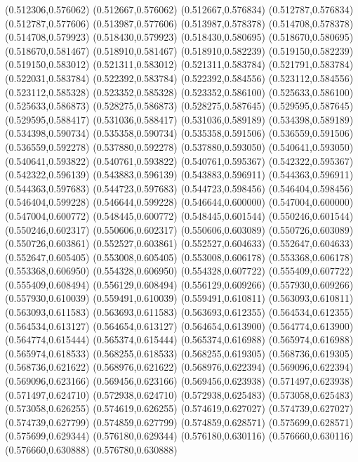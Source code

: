 (0.512306,0.576062)
(0.512667,0.576062)
(0.512667,0.576834)
(0.512787,0.576834)
(0.512787,0.577606)
(0.513987,0.577606)
(0.513987,0.578378)
(0.514708,0.578378)
(0.514708,0.579923)
(0.518430,0.579923)
(0.518430,0.580695)
(0.518670,0.580695)
(0.518670,0.581467)
(0.518910,0.581467)
(0.518910,0.582239)
(0.519150,0.582239)
(0.519150,0.583012)
(0.521311,0.583012)
(0.521311,0.583784)
(0.521791,0.583784)
(0.522031,0.583784)
(0.522392,0.583784)
(0.522392,0.584556)
(0.523112,0.584556)
(0.523112,0.585328)
(0.523352,0.585328)
(0.523352,0.586100)
(0.525633,0.586100)
(0.525633,0.586873)
(0.528275,0.586873)
(0.528275,0.587645)
(0.529595,0.587645)
(0.529595,0.588417)
(0.531036,0.588417)
(0.531036,0.589189)
(0.534398,0.589189)
(0.534398,0.590734)
(0.535358,0.590734)
(0.535358,0.591506)
(0.536559,0.591506)
(0.536559,0.592278)
(0.537880,0.592278)
(0.537880,0.593050)
(0.540641,0.593050)
(0.540641,0.593822)
(0.540761,0.593822)
(0.540761,0.595367)
(0.542322,0.595367)
(0.542322,0.596139)
(0.543883,0.596139)
(0.543883,0.596911)
(0.544363,0.596911)
(0.544363,0.597683)
(0.544723,0.597683)
(0.544723,0.598456)
(0.546404,0.598456)
(0.546404,0.599228)
(0.546644,0.599228)
(0.546644,0.600000)
(0.547004,0.600000)
(0.547004,0.600772)
(0.548445,0.600772)
(0.548445,0.601544)
(0.550246,0.601544)
(0.550246,0.602317)
(0.550606,0.602317)
(0.550606,0.603089)
(0.550726,0.603089)
(0.550726,0.603861)
(0.552527,0.603861)
(0.552527,0.604633)
(0.552647,0.604633)
(0.552647,0.605405)
(0.553008,0.605405)
(0.553008,0.606178)
(0.553368,0.606178)
(0.553368,0.606950)
(0.554328,0.606950)
(0.554328,0.607722)
(0.555409,0.607722)
(0.555409,0.608494)
(0.556129,0.608494)
(0.556129,0.609266)
(0.557930,0.609266)
(0.557930,0.610039)
(0.559491,0.610039)
(0.559491,0.610811)
(0.563093,0.610811)
(0.563093,0.611583)
(0.563693,0.611583)
(0.563693,0.612355)
(0.564534,0.612355)
(0.564534,0.613127)
(0.564654,0.613127)
(0.564654,0.613900)
(0.564774,0.613900)
(0.564774,0.615444)
(0.565374,0.615444)
(0.565374,0.616988)
(0.565974,0.616988)
(0.565974,0.618533)
(0.568255,0.618533)
(0.568255,0.619305)
(0.568736,0.619305)
(0.568736,0.621622)
(0.568976,0.621622)
(0.568976,0.622394)
(0.569096,0.622394)
(0.569096,0.623166)
(0.569456,0.623166)
(0.569456,0.623938)
(0.571497,0.623938)
(0.571497,0.624710)
(0.572938,0.624710)
(0.572938,0.625483)
(0.573058,0.625483)
(0.573058,0.626255)
(0.574619,0.626255)
(0.574619,0.627027)
(0.574739,0.627027)
(0.574739,0.627799)
(0.574859,0.627799)
(0.574859,0.628571)
(0.575699,0.628571)
(0.575699,0.629344)
(0.576180,0.629344)
(0.576180,0.630116)
(0.576660,0.630116)
(0.576660,0.630888)
(0.576780,0.630888)
